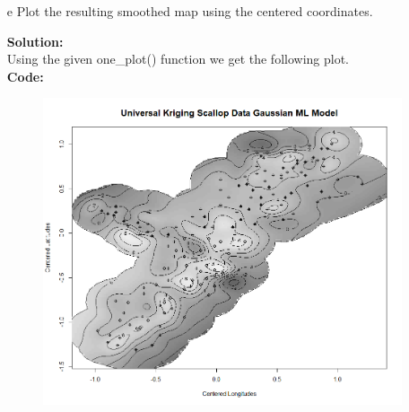 \documentclass[12pt]{article}
\makeatletter
\theoremstyle{homework}
\newenvironment{exercise}[1]
{\def\@currentlabel{#1}\exercisecore}
{\endexercisecore}
\newcommand{\localhead}[1]{\par\smallskip\noindent\textbf{#1}\nobreak\\}%
\newcommand\solution{\localhead{Solution:}}
\makeatother
\begin{document}
\begin{exercise}{2}
\begin{enumerate}
    \item[e] Plot the resulting smoothed map using the centered coordinates.\\
    \solution Using the given one\_plot() function we get the following plot.\\
    \textbf{Code:}
    \begin{center}
    
    \end{center}
    \begin{figure}[H]
      \begin{center}
      \includegraphics[width = \textwidth]{Rplot02.png}
      \end{center}
    \end{figure}
    \vspace{.15in}


\end{enumerate}
\end{exercise}
\end{document}
